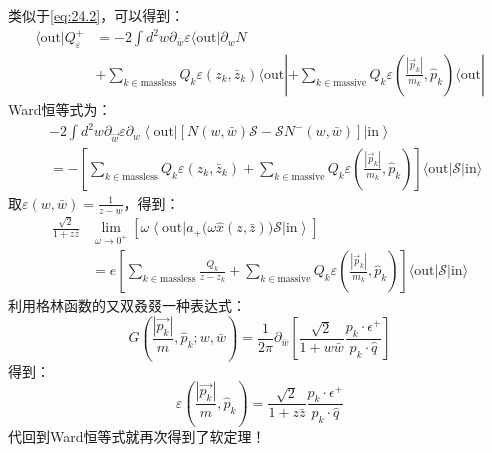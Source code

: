 类似于\ref{eq:24.2}，可以得到：
\begin{equation}
	\begin{aligned}
		\langle\mathrm{out}|Q_{\varepsilon}^{+}& =-2\int d^{2}w\partial_{\bar{w}}\varepsilon\langle\mathrm{out}|\partial_{w}N  \\
		&+\sum_{k\in\mathrm{massless}}Q_{k}\varepsilon(z_{k},\bar{z}_{k})\langle\mathrm{out}|+\sum_{k\in\mathrm{massive}}Q_{k}\varepsilon\left(\frac{|\vec{p}_{k}|}{m_{k}},\hat{p}_{k}\right)\langle\mathrm{out}|
	\end{aligned}
\end{equation}
Ward恒等式为：
\begin{equation}
\begin{aligned}
	&-2\int d^{2}w\partial_{\vec{w}}\varepsilon\partial_{w}\left\langle\mathrm{out}|\left[N(w,\bar{w})\mathcal{S}-\mathcal{S}N^{-}(w,\bar{w})\right]|\mathrm{in}\right\rangle  \\
	&=-\left[\sum_{k\in\mathrm{massless}}Q_{k}\varepsilon(z_{k},\bar{z}_{k})+\sum_{k\in\mathrm{massive}}Q_{k}\varepsilon\left(\frac{|\vec{p}_{k}|}{m_{k}},\hat{p}_{k}\right)\right]\langle\mathrm{out}|\mathcal{S}|\mathrm{in}\rangle
\end{aligned}
\end{equation}
取$\varepsilon(w,\bar{w})=\frac1{z-w}$，得到：
\begin{equation}
	\begin{aligned}
		\frac{\sqrt{2}}{1+z\bar{z}}&\lim_{\omega\to0^{+}}\left[\omega\left\langle\mathrm{out}\right|a_{+}\big(\omega\hat{x}(z,\bar{z})\big)\mathcal{S}\left|\mathrm{in}\right\rangle\right] \\
		&=e\left[\sum_{k\in\text{massless}}\frac{Q_k}{z-z_k}+\sum_{k\in\text{massive}}Q_k\varepsilon\left(\frac{|\vec{p}_k|}{m_k},\hat{p}_k\right)\right]\langle\text{out}|\mathcal{S}|\text{in}\rangle
	\end{aligned}
\end{equation}
利用格林函数的又双叒叕一种表达式：
\begin{equation}
	G\left(\frac{|\vec{p_k}|}m,\hat{p}_k;w,\bar{w}\right)=\frac{1}{2\pi}\partial_{\bar{w}}\left[\frac{\sqrt{2}}{1+w\bar{w}}\frac{p_k\cdot\epsilon^+}{p_k\cdot\hat{q}}\right]
\end{equation}
得到：
\begin{equation}
	\varepsilon\left(\frac{|\vec{p_k}|}{m},\hat{p}_k\right)=\frac{\sqrt{2}}{1+z\bar{z}}\frac{p_k\cdot\epsilon^+}{p_k\cdot\hat{q}}
\end{equation}
代回到Ward恒等式就再次得到了软定理！
